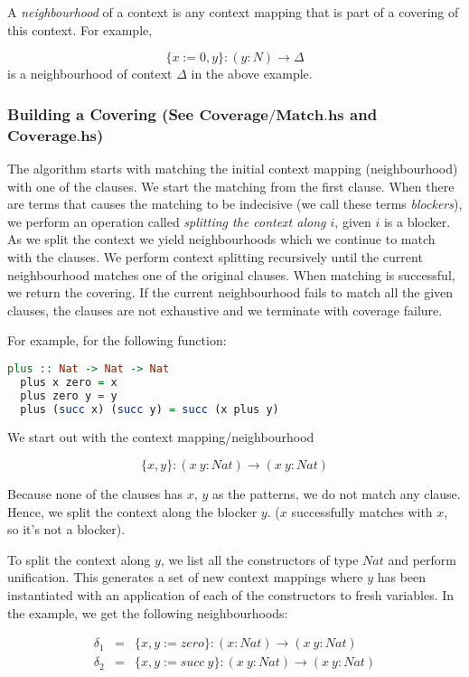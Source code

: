 A \textit{neighbourhood} of a context is any context mapping that is part of a covering of this context. For example, 

\[
  \{x := 0, y\} : (y : N) \to \Delta
\] is a neighbourhood of context $\Delta$ in the above example.

\subsubsection{Building a Covering (See $\boldsymbol{Coverage/Match.hs}$ and $\boldsymbol{Coverage.hs}$)} 

The algorithm starts with matching the initial context mapping (neighbourhood) with one of the clauses. We start the matching from the first clause. When there are terms that causes the matching to be indecisive (we call these terms \textit{blockers}), we perform an operation called \textit{splitting the context along $i$}, given $i$ is a blocker. As we split the context we yield neighbourhoods which we continue to match with the clauses. We perform context splitting recursively until the current neighbourhood matches one of the original clauses. When matching is successful, we return the covering. If the current neighbourhood fails to match all the given clauses, the clauses are not exhaustive and we terminate with coverage failure.

For example, for the following function:

\begin{lstlisting}[language=haskell]
  plus :: Nat -> Nat -> Nat
  plus x zero = x
  plus zero y = y
  plus (succ x) (succ y) = succ (x plus y)
\end{lstlisting}

We start out with the context mapping/neighbourhood

\[
  \{x,y\} : (x \ y : Nat) \to (x \ y : Nat)
\]

Because none of the clauses has $x$, $y$ as the patterns, we do not match any clause. Hence, we split the context along the blocker $y$. ($x$ successfully matches with $x$, so it's not a blocker). 
 
To split the context along $y$, we list all the constructors of type $Nat$ and perform unification. This generates a set of new context mappings where $y$ has been instantiated with an application of each of the constructors to fresh variables. In the example, we get the following neighbourhoods:

\begin{figure}[H]
  \begin{equation*}
    \begin{aligned}
      \delta_1 & = & \{x, y := zero\} : (x : Nat) \to (x \ y : Nat) \\
      \delta_2 & = & \{x, y := succ \ y\} : (x \ y : Nat) \to (x \ y : Nat) \\
    \end{aligned}
  \end{equation*}
\end{figure}

